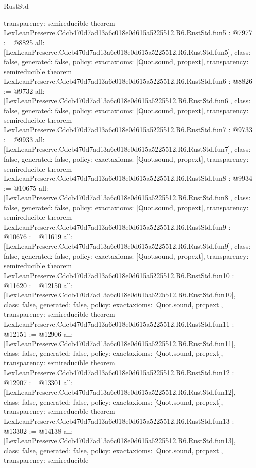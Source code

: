\begin{lexlean}{RustStd}
\begin{coremodule}
{  transparency: semireducible
}
theorem LexLeanPreserve.Cdcb470d7ad13a6c018e0d615a5225512.R6.RustStd.fun5 : @7977 := @8825 {
  all: [LexLeanPreserve.Cdcb470d7ad13a6c018e0d615a5225512.R6.RustStd.fun5],
  class: false,
  generated: false,
  policy: exact{axioms: [Quot.sound, propext]},
  transparency: semireducible
}
theorem LexLeanPreserve.Cdcb470d7ad13a6c018e0d615a5225512.R6.RustStd.fun6 : @8826 := @9732 {
  all: [LexLeanPreserve.Cdcb470d7ad13a6c018e0d615a5225512.R6.RustStd.fun6],
  class: false,
  generated: false,
  policy: exact{axioms: [Quot.sound, propext]},
  transparency: semireducible
}
theorem LexLeanPreserve.Cdcb470d7ad13a6c018e0d615a5225512.R6.RustStd.fun7 : @9733 := @9933 {
  all: [LexLeanPreserve.Cdcb470d7ad13a6c018e0d615a5225512.R6.RustStd.fun7],
  class: false,
  generated: false,
  policy: exact{axioms: [Quot.sound, propext]},
  transparency: semireducible
}
theorem LexLeanPreserve.Cdcb470d7ad13a6c018e0d615a5225512.R6.RustStd.fun8 : @9934 := @10675 {
  all: [LexLeanPreserve.Cdcb470d7ad13a6c018e0d615a5225512.R6.RustStd.fun8],
  class: false,
  generated: false,
  policy: exact{axioms: [Quot.sound, propext]},
  transparency: semireducible
}
theorem LexLeanPreserve.Cdcb470d7ad13a6c018e0d615a5225512.R6.RustStd.fun9 : @10676 := @11619 {
  all: [LexLeanPreserve.Cdcb470d7ad13a6c018e0d615a5225512.R6.RustStd.fun9],
  class: false,
  generated: false,
  policy: exact{axioms: [Quot.sound, propext]},
  transparency: semireducible
}
theorem LexLeanPreserve.Cdcb470d7ad13a6c018e0d615a5225512.R6.RustStd.fun10 : @11620 := @12150 {
  all: [LexLeanPreserve.Cdcb470d7ad13a6c018e0d615a5225512.R6.RustStd.fun10],
  class: false,
  generated: false,
  policy: exact{axioms: [Quot.sound, propext]},
  transparency: semireducible
}
theorem LexLeanPreserve.Cdcb470d7ad13a6c018e0d615a5225512.R6.RustStd.fun11 : @12151 := @12906 {
  all: [LexLeanPreserve.Cdcb470d7ad13a6c018e0d615a5225512.R6.RustStd.fun11],
  class: false,
  generated: false,
  policy: exact{axioms: [Quot.sound, propext]},
  transparency: semireducible
}
theorem LexLeanPreserve.Cdcb470d7ad13a6c018e0d615a5225512.R6.RustStd.fun12 : @12907 := @13301 {
  all: [LexLeanPreserve.Cdcb470d7ad13a6c018e0d615a5225512.R6.RustStd.fun12],
  class: false,
  generated: false,
  policy: exact{axioms: [Quot.sound, propext]},
  transparency: semireducible
}
theorem LexLeanPreserve.Cdcb470d7ad13a6c018e0d615a5225512.R6.RustStd.fun13 : @13302 := @14138 {
  all: [LexLeanPreserve.Cdcb470d7ad13a6c018e0d615a5225512.R6.RustStd.fun13],
  class: false,
  generated: false,
  policy: exact{axioms: [Quot.sound, propext]},
  transparency: semireducible
}
\end{coremodule}
\end{lexlean}
